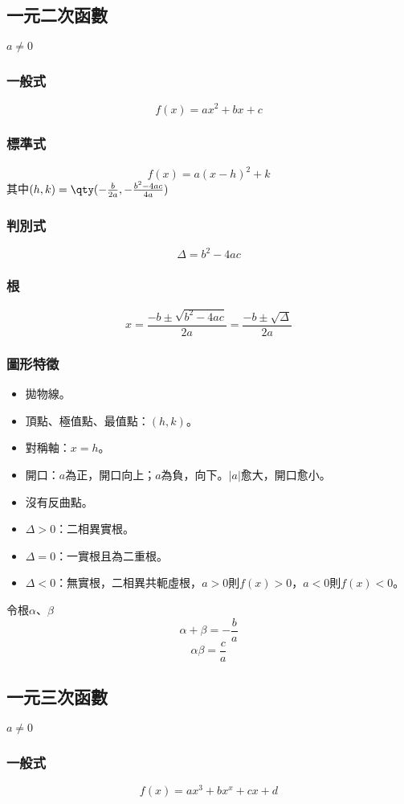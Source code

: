 \documentclass[a4paper,12pt]{report}
\begin{document}
\subsection{一元二次函數}
$a\neq 0$
\subsubsection{一般式}
\[f(x)=ax^2+bx+c\]
\subsubsection{標準式}
\[f(x)=a(x-h)^2+k\]
其中$ (h,k)=\qty(-\frac{b}{2a},-\frac{b^2-4ac}{4a})$
\subsubsection{判別式}
\[\Delta=b^2-4ac\]
\subsubsection{根}
\[x =\frac{-b\pm\sqrt{b^2-4ac}}{2a}=\frac{-b\pm\sqrt{\Delta}}{2a}\]
\subsubsection{圖形特徵}
\begin{itemize}
\item 拋物線。
\item 頂點、極值點、最值點：$(h,k)$。
\item 對稱軸：$x=h$。
\item 開口：$a$為正，開口向上；$a$為負，向下。$|a|$愈大，開口愈小。
\item 沒有反曲點。
\end{itemize}
\begin{itemize}
\item $\Delta>0$：二相異實根。
\item $\Delta=0$：一實根且為二重根。
\item $\Delta<0$：無實根，二相異共軛虛根，$a>0$則$f(x)>0$，$a<0$則$f(x)<0$。
\end{itemize}
令根$\alpha$、$\beta$
\[\alpha+\beta=-\frac{b}{a}\]
\[\alpha\beta=\frac{c}{a}\]
\subsection{一元三次函數}
$a\neq 0$
\subsubsection{一般式}
\[f(x)=ax^3+bx^x+cx+d\]
\end{document}
